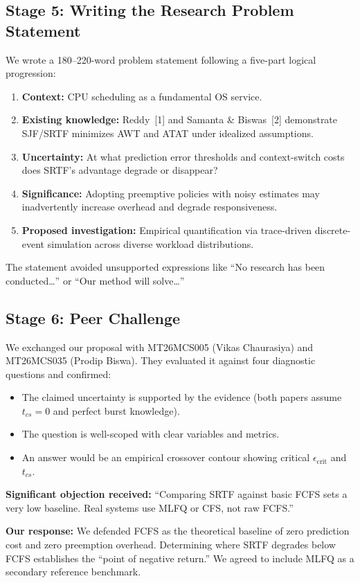 \documentclass[11pt, a4paper]{article}
\begin{document}
\subsection{Stage 5: Writing the Research Problem Statement}
We wrote a 180--220-word problem statement following a five-part logical progression:
\begin{enumerate}[nosep]
    \item \textbf{Context:} CPU scheduling as a fundamental OS service.
    \item \textbf{Existing knowledge:} Reddy~[1] and Samanta \& Biswas~[2] demonstrate SJF/SRTF minimizes AWT and ATAT under idealized assumptions.
    \item \textbf{Uncertainty:} At what prediction error thresholds and context-switch costs does SRTF's advantage degrade or disappear?
    \item \textbf{Significance:} Adopting preemptive policies with noisy estimates may inadvertently increase overhead and degrade responsiveness.
    \item \textbf{Proposed investigation:} Empirical quantification via trace-driven discrete-event simulation across diverse workload distributions.
\end{enumerate}
The statement avoided unsupported expressions like ``No research has been conducted\ldots'' or ``Our method will solve\ldots''

\subsection{Stage 6: Peer Challenge}
We exchanged our proposal with MT26MCS005 (Vikas Chaurasiya) and MT26MCS035 (Prodip Biswa). They evaluated it against four diagnostic questions and confirmed:
\begin{itemize}[nosep]
    \item The claimed uncertainty is supported by the evidence (both papers assume $t_{cs}=0$ and perfect burst knowledge).
    \item The question is well-scoped with clear variables and metrics.
    \item An answer would be an empirical crossover contour showing critical $\epsilon_{\text{crit}}$ and $t_{cs}$.
\end{itemize}

\textbf{Significant objection received:} ``Comparing SRTF against basic FCFS sets a very low baseline. Real systems use MLFQ or CFS, not raw FCFS.''

\textbf{Our response:} We defended FCFS as the theoretical baseline of zero prediction cost and zero preemption overhead. Determining where SRTF degrades below FCFS establishes the ``point of negative return.'' We agreed to include MLFQ as a secondary reference benchmark.
\end{document}
